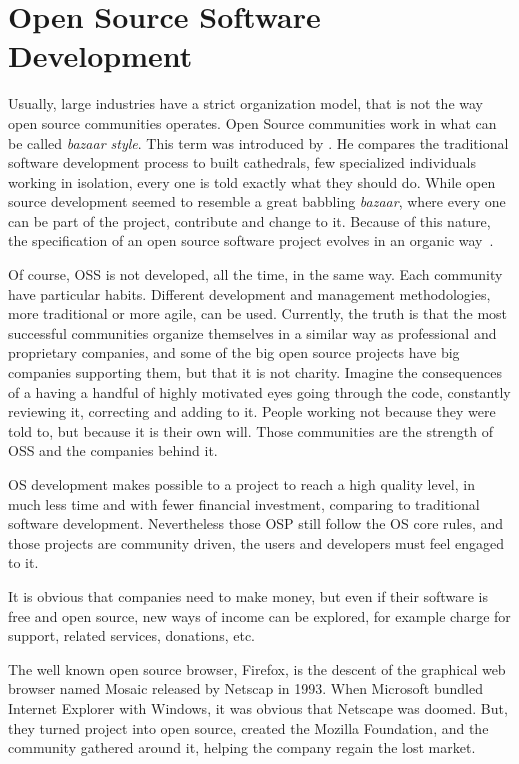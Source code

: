 \section{Open Source Software Development}
Usually, large industries have a strict organization model, that is not the way open source communities operates.
Open Source communities work in what can be called \textit{bazaar style}.
This term was introduced by \cite{raymondcathedral}. 
He compares the traditional software development process to built cathedrals,
few specialized individuals working in isolation, every one is told exactly what they should do.
While open source development seemed to resemble a great babbling \textit{bazaar}, 
where every one can be part of the project, contribute and change to it. 
Because of this nature, the specification of an open source software project 
evolves in an organic way~\cite{capiluppicathedral}.

Of course, OSS is not developed, all the time, in the same way. 
Each community have particular habits. 
Different development and management methodologies, more traditional or more agile, can be used.
Currently, the truth is that the most successful communities organize themselves 
in a similar way as professional and proprietary companies, 
and some of the big open source projects have big companies supporting them, 
but that it is not charity.
Imagine the consequences of a having a handful of highly motivated eyes going through the code, 
constantly reviewing it, correcting and adding to it.
People working not because they were told to, but because it is their own will.
Those communities are the strength of OSS and the companies behind it.

OS development makes possible to a project to reach a high quality level,
in much less time and with fewer financial investment, comparing to traditional software development.
Nevertheless those OSP still follow the OS core rules, 
and those projects are community driven, the users and developers must feel engaged to it.

It is obvious that companies need to make money, 
but even if their software is free and open source, new ways of income can be explored, 
for example charge for support, related services, donations, etc. 

 The well known open source browser, Firefox, 
is the descent of the graphical web browser named Mosaic released by Netscap in 1993.
When Microsoft bundled Internet Explorer with Windows, it was obvious that Netscape was doomed.
But, they turned project into open source, created the Mozilla Foundation, 
and the community gathered around it, helping the company regain the lost market. 

